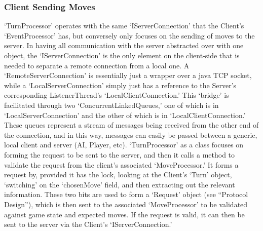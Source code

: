 \documentclass[a4paper,doc,draftfirst]{apa6}
\begin{document}
\subsubsection{Client Sending Moves}
‘TurnProcessor’ operates with the same ‘IServerConnection’ that the Client’s ‘EventProcessor’ has, but conversely only focuses on the sending of moves to the server. In having all communication with the server abstracted over with one object, the ‘IServerConnection’ is the only element on the client-side that is needed to separate a remote connection from a local one. A ‘RemoteServerConnection’ is essentially just a wrapper over a java TCP socket, while a ‘LocalServerConnection’ simply just has a reference to the Server’s corresponding ListenerThread’s ‘LocalClientConnection.’ This ‘bridge’ is facilitated through two ‘ConcurrentLinkedQueues,’ one of which is in ‘LocalServerConnection’ and the other of which is in ‘LocalClientConnection.’ These queues represent a stream of messages being received from the other end of the connection, and in this way, messages can easily be passed between a generic, local client and server (AI, Player, etc). ‘TurnProcessor’ as a class focuses on forming the request to be sent to the server, and then it calls a method to validate the request from the client’s associated ‘MoveProcessor.’ It forms a request by, provided it has the lock, looking at the Client’s ‘Turn’ object, ‘switching’ on the ‘chosenMove’ field, and then extracting out the relevant information. These two bits are used to form a ‘Request’ object (see  “Protocol Design”), which is then sent to the associated ‘MoveProcessor’ to be validated against game state and expected moves. If the request is valid, it can then be sent to the server via the Client’s ‘IServerConnection.’
\end{document}
